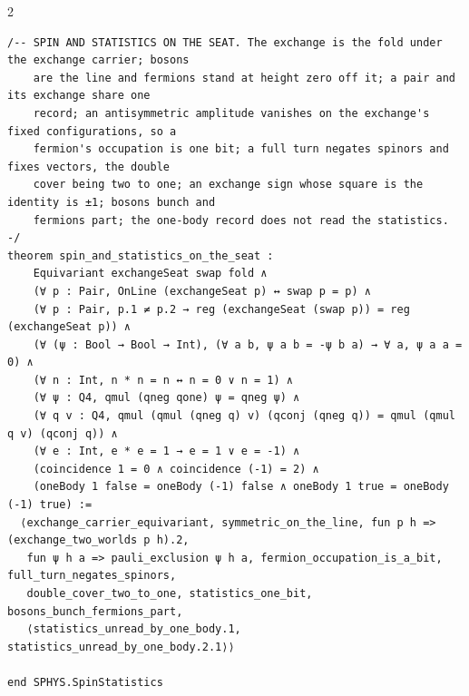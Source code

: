 \documentclass[10pt]{article}
\begin{document}
\begin{multicols}{2}
\begin{Verbatim}[fontsize=\fontsize{6.0}{6.9}\selectfont,breaklines,breakanywhere,breaksymbolleft={}]
/-- SPIN AND STATISTICS ON THE SEAT. The exchange is the fold under the exchange carrier; bosons
    are the line and fermions stand at height zero off it; a pair and its exchange share one
    record; an antisymmetric amplitude vanishes on the exchange's fixed configurations, so a
    fermion's occupation is one bit; a full turn negates spinors and fixes vectors, the double
    cover being two to one; an exchange sign whose square is the identity is ±1; bosons bunch and
    fermions part; the one-body record does not read the statistics. -/
theorem spin_and_statistics_on_the_seat :
    Equivariant exchangeSeat swap fold ∧
    (∀ p : Pair, OnLine (exchangeSeat p) ↔ swap p = p) ∧
    (∀ p : Pair, p.1 ≠ p.2 → reg (exchangeSeat (swap p)) = reg (exchangeSeat p)) ∧
    (∀ (ψ : Bool → Bool → Int), (∀ a b, ψ a b = -ψ b a) → ∀ a, ψ a a = 0) ∧
    (∀ n : Int, n * n = n ↔ n = 0 ∨ n = 1) ∧
    (∀ ψ : Q4, qmul (qneg qone) ψ = qneg ψ) ∧
    (∀ q v : Q4, qmul (qmul (qneg q) v) (qconj (qneg q)) = qmul (qmul q v) (qconj q)) ∧
    (∀ e : Int, e * e = 1 → e = 1 ∨ e = -1) ∧
    (coincidence 1 = 0 ∧ coincidence (-1) = 2) ∧
    (oneBody 1 false = oneBody (-1) false ∧ oneBody 1 true = oneBody (-1) true) :=
  ⟨exchange_carrier_equivariant, symmetric_on_the_line, fun p h => (exchange_two_worlds p h).2,
   fun ψ h a => pauli_exclusion ψ h a, fermion_occupation_is_a_bit, full_turn_negates_spinors,
   double_cover_two_to_one, statistics_one_bit, bosons_bunch_fermions_part,
   ⟨statistics_unread_by_one_body.1, statistics_unread_by_one_body.2.1⟩⟩

end SPHYS.SpinStatistics


\end{Verbatim}
\end{multicols}
\end{document}
